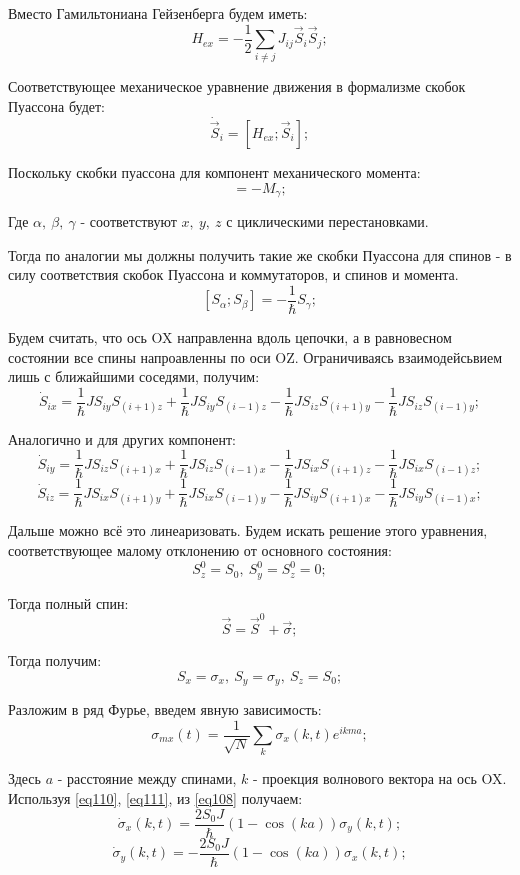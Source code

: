 \documentclass[a4paper, 14pt, russian]{article}
\newcommand{\be}{\begin{equation}}
\newcommand{\ee}{\end{equation}}
\begin{document}
	Вместо Гамильтониана Гейзенберга будем иметь:
	\be
		\label{eq105}
		H_{ex} = - \frac{1}{2} \sum_{i \neq j} J_{ij} \vec{S}_i \vec{S}_j;
	\ee 

	Соответствующее  механическое уравнение движения в формализме скобок Пуассона
	будет:
	\be
		\label{eq106}
		\dot{\vec S}_i = [H_{ex}; \vec{S}_i];
	\ee

	Поскольку скобки пуассона для компонент механического момента:
	\be
		[M_\alpha;M_\beta] = - M_\gamma;
	\ee

	Где $\alpha,~\beta,~\gamma$ - соответствуют $x,~y,~z$ с циклическими
	перестановками.

	Тогда по аналогии мы должны получить такие же скобки Пуассона
	для спинов -  в силу соответствия скобок Пуассона и коммутаторов,
	и спинов и момента.
	\be
		\label{eq107}
		[S_\alpha;S_\beta] = - \frac{1}{\hbar} S_\gamma;
	\ee

	Будем считать, что ось OX направленна вдоль цепочки,
	а в равновесном состоянии все спины напроавленны по оси OZ.
	Ограничиваясь взаимодейсьвием лишь с ближайшими соседями, получим:
	\be
		\label{eq108}
		\dot{S}_{ix} = \frac{1}{\hbar} J S_{iy} S_{(i+1)z} + \frac{1}{\hbar} J S_{iy} S_{(i-1)z} 
			- \frac{1}{\hbar} J S_{iz} S_{(i+1)y} - \frac{1}{\hbar} J S_{iz} S_{(i-1)y};
	\ee

	Аналогично и для других компонент:
	\be
		\dot{S}_{iy} = \frac{1}{\hbar} J S_{iz} S_{(i+1)x} + \frac{1}{\hbar} J S_{iz} S_{(i-1)x} 
			- \frac{1}{\hbar} J S_{ix} S_{(i+1)z} - \frac{1}{\hbar} J S_{ix} S_{(i-1)z};
	\ee
	\be
		\dot{S}_{iz} = \frac{1}{\hbar} J S_{ix} S_{(i+1)y} + \frac{1}{\hbar} J S_{ix} S_{(i-1)y} 
			- \frac{1}{\hbar} J S_{iy} S_{(i+1)x} - \frac{1}{\hbar} J S_{iy} S_{(i-1)x};
	\ee

	Дальше можно всё это линеаризовать. Будем искать решение 
	этого уравнения, соответствующее малому отклонению от основного
	состояния:
	\be
		S_z^0 = S_0,~S_y^0 = S_z^0 = 0;
	\ee

	Тогда полный спин:
	\be
		\vec S = \vec{S}^0 + \vec \sigma;
	\ee

	Тогда получим:
	\be
		\label{eq110}
		S_x = \sigma_x,~S_y = \sigma_y,~S_z = S_0;
	\ee

	Разложим в ряд Фурье, введем явную зависимость:
	\be
		\label{eq111}
		\sigma_{mx}(t) = \frac{1}{\sqrt N} \sum_k\sigma_x (k, t) e^{ikma}; 
	\ee

	Здесь $a$ - расстояние между спинами, $k$ - проекция волнового 
	вектора на ось OX. Используя \ref{eq110}, \ref{eq111}, из \ref{eq108}
	получаем:
	\be
		\label{eq112}
		\dot{\sigma}_x (k,t) = \frac{2S_0 J}{\hbar} (1 - \cos(ka)) \sigma_y(k,t);
	\ee
	\be
		\dot{\sigma}_y (k,t) =  - \frac{2S_0 J}{\hbar} (1 - \cos(ka)) \sigma_x(k,t);
	\ee
\end{document}
